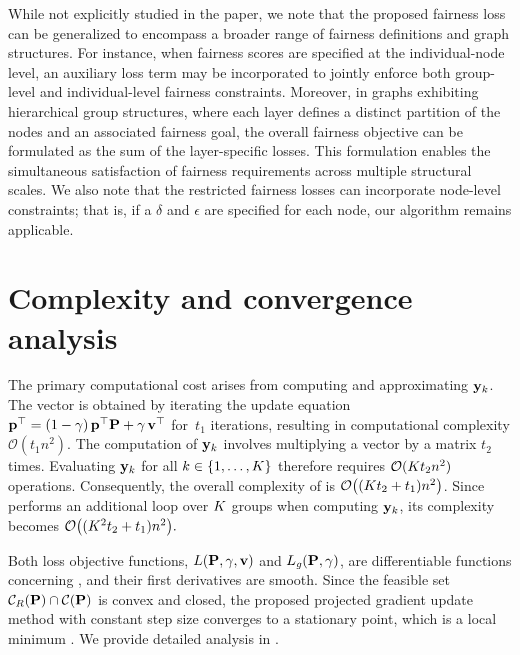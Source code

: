 \documentclass[sigconf, anonymous, review]{acmart}
\begin{document}
While not explicitly studied in the paper, we note that the proposed fairness loss can be generalized to encompass a broader range of fairness definitions and graph structures. For instance, when fairness scores are specified at the individual-node level, an auxiliary loss term may be incorporated to jointly enforce both group-level and individual-level fairness constraints. Moreover, in graphs exhibiting hierarchical group structures, where each layer defines a distinct partition of the nodes and an associated fairness goal, the overall fairness objective can be formulated as the sum of the layer-specific losses. This formulation enables the simultaneous satisfaction of fairness requirements across multiple structural scales. We also note that the restricted fairness losses can incorporate node-level constraints; that is, if a $\delta$ and $\epsilon$ are specified for each node, our algorithm remains applicable.


\section{Complexity and convergence analysis}

The primary computational cost arises from computing \pagerank{} and approximating $\mathbf{{y}}_k$. 
The \pagerank{} vector is obtained by iterating the update equation $\mathbf{{p}}^\top = (1 - \gamma)\, \mathbf{{p}}^\top \mathbf{{P}} + \gamma\, \mathbf{{v}}^\top$
for~$t_1$ iterations, resulting in computational complexity $\mathcal{O}(t_1 n^2)$. 
The computation of $\mathbf{{y}}_k$ involves multiplying a vector by a matrix $t_2$ times. 
Evaluating $\mathbf{{y}}_k$ for all $k \in \{1, \dots, K\}$ therefore requires $\mathcal{O}(K t_2 n^2)$ operations. 
Consequently, the overall complexity of  is $\mathcal{O}\big((K  t_2 + t_1) n^2\big)$.
Since \crossgd{} performs an additional loop over $K$ groups when computing $\mathbf{{y}}_k$, its complexity becomes $\mathcal{O}\big((K^2 t_2 + t_1) n^2\big).$


Both loss objective functions, $L(\mathbf{{P}},\gamma,\mathbf{{v}})$ and $L_{\mathit{g}}(\mathbf{{P}}, \gamma)$, are differentiable functions concerning \transmatrix, and their first derivatives are smooth. Since the feasible set $\mathcal{C}_R(\mathbf{{P}}) \cap \mathcal{C}(\mathbf{{P}})$ is convex and closed, the proposed projected gradient update method with constant step size converges to a stationary point, which is a local minimum \cite{bertsekas1997nonlinear}. 
We provide detailed analysis in 
.
\end{document}
